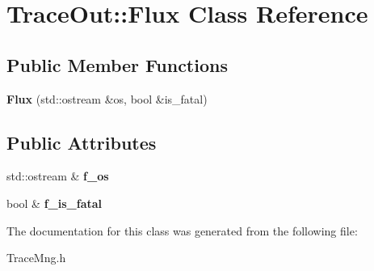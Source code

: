 \hypertarget{classTraceOut_1_1Flux}{
\section{TraceOut::Flux Class Reference}
\label{classTraceOut_1_1Flux}
}
\subsection*{Public Member Functions}
\begin{DoxyCompactItemize}
\item 
\hypertarget{classTraceOut_1_1Flux_aa39e09f5dd5bfa04a8be3eef8cfa17cd}{
{\bfseries Flux} (std::ostream \&os, bool \&is\_\-fatal)}
\label{classTraceOut_1_1Flux_aa39e09f5dd5bfa04a8be3eef8cfa17cd}

\end{DoxyCompactItemize}
\subsection*{Public Attributes}
\begin{DoxyCompactItemize}
\item 
\hypertarget{classTraceOut_1_1Flux_a4ea5098a346240d4a5d8af0b8aa5f205}{
std::ostream \& {\bfseries f\_\-os}}
\label{classTraceOut_1_1Flux_a4ea5098a346240d4a5d8af0b8aa5f205}

\item 
\hypertarget{classTraceOut_1_1Flux_a04866de0cc0e129c146e7f9d51aa0304}{
bool \& {\bfseries f\_\-is\_\-fatal}}
\label{classTraceOut_1_1Flux_a04866de0cc0e129c146e7f9d51aa0304}

\end{DoxyCompactItemize}


The documentation for this class was generated from the following file:\begin{DoxyCompactItemize}
\item 
TraceMng.h\end{DoxyCompactItemize}
